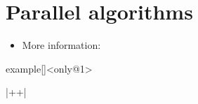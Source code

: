 \section{Parallel algorithms}
\begin{frame}[fragile]{\insertsectionhead}
    \vspace{-3mm}
    \begin{itemize}
        \item More information: 
    \end{itemize}
\end{frame}
\begin{frame}[fragile]{}
    \begin{varblock}{example}[\textwidth]{}<only@1>
        \begin{Cpp}
        \end{Cpp}
        \begin{Bash}[numbers=none]
            |++|
        \end{Bash}
    \end{varblock}
\end{frame}


